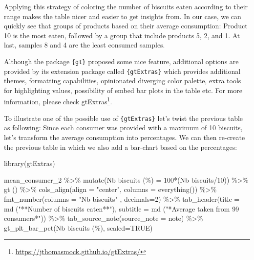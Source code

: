 \documentclass[
]{krantz}
\makeatletter
\newenvironment{Shaded}{\begin{snugshade}}{\end{snugshade}}
\newcommand{\AttributeTok}[1]{\textcolor[rgb]{0.61,0.61,0.61}{#1}}
\newcommand{\ConstantTok}[1]{\textcolor[rgb]{0,0,0}{#1}}
\newcommand{\DecValTok}[1]{\textcolor[rgb]{0.06,0.06,0.06}{#1}}
\newcommand{\FunctionTok}[1]{\textcolor[rgb]{0,0,0}{#1}}
\newcommand{\NormalTok}[1]{#1}
\newcommand{\OtherTok}[1]{\textcolor[rgb]{0.37,0.37,0.37}{#1}}
\newcommand{\SpecialCharTok}[1]{\textcolor[rgb]{0,0,0}{#1}}
\newcommand{\StringTok}[1]{\textcolor[rgb]{0.5,0.5,0.5}{#1}}
\renewcommand{\href}[2]{#2\footnote{\url{#1}}}
\newenvironment{kframe}{%
\medskip{}
\setlength{\fboxsep}{.8em}
 \def\at@end@of@kframe{}%
 \ifinner\ifhmode%
  \def\at@end@of@kframe{\end{minipage}}%
  \begin{minipage}{\columnwidth}%
 \fi\fi%
 \def\FrameCommand##1{\hskip\@totalleftmargin \hskip-\fboxsep
 \colorbox{shadecolor}{##1}\hskip-\fboxsep
     \hskip-\linewidth \hskip-\@totalleftmargin \hskip\columnwidth}%
 \MakeFramed {\advance\hsize-\width
   \@totalleftmargin\z@ \linewidth\hsize
   \@setminipage}}%
 {\par\unskip\endMakeFramed%
 \at@end@of@kframe}
\renewenvironment{Shaded}{\begin{kframe}}{\end{kframe}}
\makeatother
\begin{document}
Applying this strategy of coloring the number of biscuits eaten according to their range makes the table nicer and easier to get insights from. In our case, we can quickly see that groups of products based on their average consumption: Product 10 is the most eaten, followed by a group that include products 5, 2, and 1. At last, samples 8 and 4 are the least consumed samples.

Although the package \texttt{\{gt\}} proposed some nice feature, additional options are provided by its extension package called \texttt{\{gtExtras\}} which provides additional themes, formatting capabilities, opinionated diverging color palette, extra tools for highlighting values, possibility of embed bar plots in the table etc. For more information, please check \href{https://jthomasmock.github.io/gtExtras/}{gtExtras}.

To illustrate one of the possible use of \texttt{\{gtExtras\}} let's twist the previous table as following: Since each consumer was provided with a maximum of 10 biscuits, let's transform the average consumption into percentages. We can then re-create the previous table in which we also add a bar-chart based on the percentages:

\begin{Shaded}
\begin{Highlighting}[]
\FunctionTok{library}\NormalTok{(gtExtras)}

\NormalTok{mean\_consumer\_2 }\SpecialCharTok{\%\textgreater{}\%}
  \FunctionTok{mutate}\NormalTok{(}\StringTok{\textasciigrave{}}\AttributeTok{Nb biscuits (\%)}\StringTok{\textasciigrave{}} \OtherTok{=} \DecValTok{100}\SpecialCharTok{*}\NormalTok{(}\StringTok{\textasciigrave{}}\AttributeTok{Nb biscuits}\StringTok{\textasciigrave{}}\SpecialCharTok{/}\DecValTok{10}\NormalTok{)) }\SpecialCharTok{\%\textgreater{}\%} 
  \FunctionTok{gt}\NormalTok{ () }\SpecialCharTok{\%\textgreater{}\%}
  \FunctionTok{cols\_align}\NormalTok{(}\AttributeTok{align =} \StringTok{"center"}\NormalTok{, }\AttributeTok{columns =} \FunctionTok{everything}\NormalTok{()) }\SpecialCharTok{\%\textgreater{}\%}
  \FunctionTok{fmt\_number}\NormalTok{(}\AttributeTok{columns =} \StringTok{"Nb biscuits"}\NormalTok{ , }\AttributeTok{decimals=}\DecValTok{2}\NormalTok{) }\SpecialCharTok{\%\textgreater{}\%}
  \FunctionTok{tab\_header}\NormalTok{(}\AttributeTok{title =} \FunctionTok{md}\NormalTok{ (}\StringTok{"**Number of biscuits eaten**"}\NormalTok{), }
             \AttributeTok{subtitle =} \FunctionTok{md}\NormalTok{ (}\StringTok{"*Average taken from 99 consumers*"}\NormalTok{)) }\SpecialCharTok{\%\textgreater{}\%}
  \FunctionTok{tab\_source\_note}\NormalTok{(}\AttributeTok{source\_note =}\NormalTok{ note) }\SpecialCharTok{\%\textgreater{}\%} 
  \FunctionTok{gt\_plt\_bar\_pct}\NormalTok{(}\StringTok{\textasciigrave{}}\AttributeTok{Nb biscuits (\%)}\StringTok{\textasciigrave{}}\NormalTok{, }\AttributeTok{scaled=}\ConstantTok{TRUE}\NormalTok{)}
\end{Highlighting}
\end{Shaded}
\end{document}
